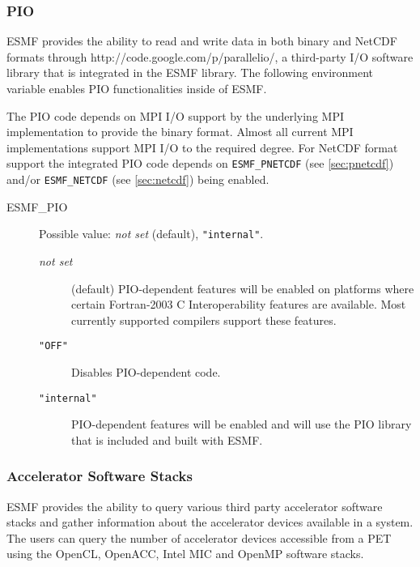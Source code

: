 \subsubsection{PIO}
\label{sec:pio}
ESMF provides the ability to read and write data in both binary and 
NetCDF formats through 
{http://code.google.com/p/parallelio/}, a third-party I/O software
library that is integrated in the ESMF library. The following environment
variable enables PIO functionalities inside of ESMF.

The PIO code depends on MPI I/O support by the underlying MPI
implementation to provide the binary format. Almost all current MPI
implementations support MPI I/O to the required degree. For NetCDF format
support the integrated PIO code depends on {\tt ESMF\_PNETCDF}
(see \ref{sec:pnetcdf}) and/or {\tt ESMF\_NETCDF} (see \ref{sec:netcdf})
being enabled.

\begin{description}
\item[ESMF\_PIO] Possible value: {\it not set} (default), {\tt "internal"}.

\begin{description}
\item[{\it not set}] (default) PIO-dependent features will be enabled on platforms where
certain Fortran-2003 C Interoperability features are available.  Most currently supported
compilers support these features.

\item[{\tt "OFF"}] Disables PIO-dependent code.

\item[{\tt "internal"}] PIO-dependent features will be enabled and will use the 
PIO library that is included and built with ESMF.  

\end{description}

\end{description}

\subsubsection{Accelerator Software Stacks}
\label{sec:acc}
ESMF provides the ability to query various third party accelerator software
stacks and gather information about the accelerator devices available in a
system. The users can query the number of accelerator devices accessible
from a PET using the OpenCL, OpenACC, Intel MIC and OpenMP software stacks.

